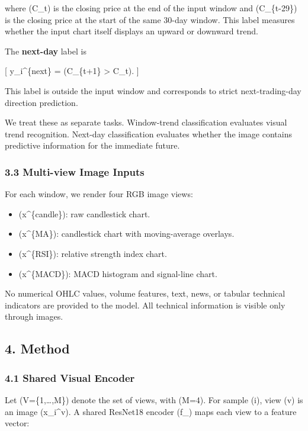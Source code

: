 \documentclass[
]{article}
\providecommand{\tightlist}{%
  \setlength{\itemsep}{0pt}\setlength{\parskip}{0pt}}
\begin{document}
where (C\_t) is the closing price at the end of the input window and
(C\_\{t-29\}) is the closing price at the start of the same 30-day
window. This label measures whether the input chart itself displays an
upward or downward trend.

The \textbf{next-day} label is

{[} y\_i\^{}\{next\} = (C\_\{t+1\} \textgreater{} C\_t). {]}

This label is outside the input window and corresponds to strict
next-trading-day direction prediction.

We treat these as separate tasks. Window-trend classification evaluates
visual trend recognition. Next-day classification evaluates whether the
image contains predictive information for the immediate future.

\subsubsection{3.3 Multi-view Image
Inputs}\label{multi-view-image-inputs}

For each window, we render four RGB image views:

\begin{itemize}
\tightlist
\item
  (x\^{}\{candle\}): raw candlestick chart.
\item
  (x\^{}\{MA\}): candlestick chart with moving-average overlays.
\item
  (x\^{}\{RSI\}): relative strength index chart.
\item
  (x\^{}\{MACD\}): MACD histogram and signal-line chart.
\end{itemize}

No numerical OHLC values, volume features, text, news, or tabular
technical indicators are provided to the model. All technical
information is visible only through images.

\subsection{4. Method}\label{method}

\subsubsection{4.1 Shared Visual Encoder}\label{shared-visual-encoder}

Let (V=\{1,\ldots,M\}) denote the set of views, with (M=4). For sample
(i), view (v) is an image (x\_i\^{}v). A shared ResNet18 encoder
(f\_\theta) maps each view to a feature vector:
\end{document}
